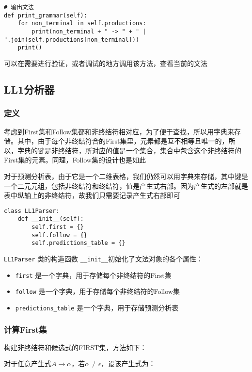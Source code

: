 \documentclass[lang=cn,11pt,a4paper]{elegantpaper}
\begin{document}
\begin{lstlisting}
# 输出文法
def print_grammar(self):
    for non_terminal in self.productions:
        print(non_terminal + " -> " + " | ".join(self.productions[non_terminal]))
    print()
\end{lstlisting}

可以在需要进行验证，或者调试的地方调用该方法，查看当前的文法

\subsection{LL1分析器}

\subsubsection{定义}

考虑到First集和Follow集都和非终结符相对应，为了便于查找，所以用字典来存储。其中，由于每个非终结符合的First集里，元素都是互不相等且唯一的，所以，字典的键是非终结符，所对应的值是一个集合，集合中包含这个非终结符的First集的元素。同理，Follow集的设计也是如此

对于预测分析表，由于它是一个二维表格，我们仍然可以用字典来存储，其中键是一个二元元组，包括非终结符和终结符，值是产生式右部。因为产生式的左部就是表中纵轴上的非终结符，故我们只需要记录产生式右部即可

\begin{lstlisting}
class LL1Parser:
    def __init__(self):
        self.first = {}
        self.follow = {}
        self.predictions_table = {}
\end{lstlisting}

\lstinline{LL1Parser} 类的构造函数 \lstinline{__init__}初始化了文法对象的各个属性：
\begin{itemize}
    \item \lstinline{first} 是一个字典，用于存储每个非终结符的First集
    \item \lstinline{follow} 是一个字典，用于存储每个非终结符的Follow集
    \item \lstinline{predictions_table} 是一个字典，用于存储预测分析表
\end{itemize}

\subsubsection{计算First集}
构建非终结符和候选式的FIRST集，方法如下：

对于任意产生式$A\rightarrow\alpha$，若$\alpha\not=\epsilon$，设该产生式为：
\end{document}
